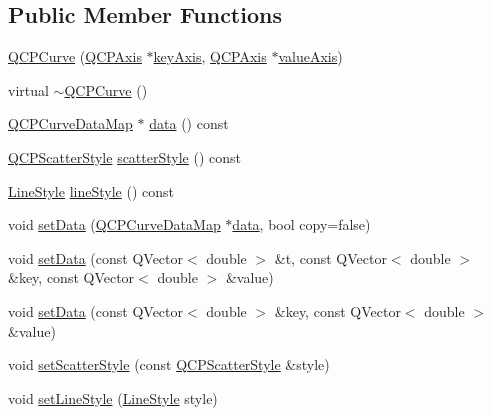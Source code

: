 \subsection*{Public Member Functions}
\begin{DoxyCompactItemize}
\item 
\hyperlink{class_q_c_p_curve_a36de58e2652b3fa47bdf9187d421d3ce}{Q\+C\+P\+Curve} (\hyperlink{class_q_c_p_axis}{Q\+C\+P\+Axis} $\ast$\hyperlink{class_q_c_p_abstract_plottable_a72c7a09c22963f2c943f07112b311103}{key\+Axis}, \hyperlink{class_q_c_p_axis}{Q\+C\+P\+Axis} $\ast$\hyperlink{class_q_c_p_abstract_plottable_a3106f9d34d330a6097a8ec5905e5b519}{value\+Axis})
\item 
virtual \hyperlink{class_q_c_p_curve_a99ee5136754884a220cc0bcacfe419a3}{$\sim$\+Q\+C\+P\+Curve} ()
\item 
\hyperlink{qcustomplot_8h_a444d37ec9cb2951b3a7fe443c34d1658}{Q\+C\+P\+Curve\+Data\+Map} $\ast$ \hyperlink{class_q_c_p_curve_a9ac194d35d4f334923aac9df1bf599ca}{data} () const 
\item 
\hyperlink{class_q_c_p_scatter_style}{Q\+C\+P\+Scatter\+Style} \hyperlink{class_q_c_p_curve_a9ab864c9f6ba0cedf65853f59d867a68}{scatter\+Style} () const 
\item 
\hyperlink{class_q_c_p_curve_a2710e9f79302152cff794c6e16cc01f1}{Line\+Style} \hyperlink{class_q_c_p_curve_a0314dd644258949aeb4a95cebde5abaf}{line\+Style} () const 
\item 
void \hyperlink{class_q_c_p_curve_a631ac886708460013b30052f49cbc9da}{set\+Data} (\hyperlink{qcustomplot_8h_a444d37ec9cb2951b3a7fe443c34d1658}{Q\+C\+P\+Curve\+Data\+Map} $\ast$\hyperlink{class_q_c_p_curve_a9ac194d35d4f334923aac9df1bf599ca}{data}, bool copy=false)
\item 
void \hyperlink{class_q_c_p_curve_affe80e011e2ced62a88f614acd6ab8d1}{set\+Data} (const Q\+Vector$<$ double $>$ \&t, const Q\+Vector$<$ double $>$ \&key, const Q\+Vector$<$ double $>$ \&value)
\item 
void \hyperlink{class_q_c_p_curve_a963d4c45777deef15848a8f56172d066}{set\+Data} (const Q\+Vector$<$ double $>$ \&key, const Q\+Vector$<$ double $>$ \&value)
\item 
void \hyperlink{class_q_c_p_curve_a55e43b44709bf50a35500644988aa706}{set\+Scatter\+Style} (const \hyperlink{class_q_c_p_scatter_style}{Q\+C\+P\+Scatter\+Style} \&style)
\item 
void \hyperlink{class_q_c_p_curve_a4a377ec863ff81a1875c3094a6177c19}{set\+Line\+Style} (\hyperlink{class_q_c_p_curve_a2710e9f79302152cff794c6e16cc01f1}{Line\+Style} style)

\end{DoxyCompactItemize}

